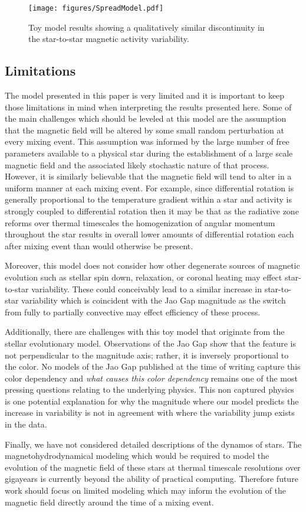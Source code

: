 \begin{figure}
  \centering
  \texttt{[image: figures/SpreadModel.pdf]}
  \caption{Toy model results showing a qualitatively similar discontinuity in the star-to-star magnetic activity variability.}
  \label{fig:model}
\end{figure}

\subsection{Limitations}
The model presented in this paper is very limited and it is important to keep
those limitations in mind when interpreting the results presented here. Some of
the main challenges which should be leveled at this model are the assumption
that the magnetic field will be altered by some small random perturbation at
every mixing event. This assumption was informed by the large number of free
parameters available to a physical star during the establishment of a large scale 
magnetic field and the associated likely stochastic nature of that process.
However, it is similarly believable that the magnetic field will tend to alter in
a uniform manner at each mixing event. For example, since differential rotation
is generally proportional to the temperature gradient within a star and activity is
strongly coupled to differential rotation then it may be that as the radiative zone reforms over thermal timescales the homogenization of angular momentum throughout the star results in overall lower amounts of differential rotation each after mixing event than would otherwise be present.

Moreover, this model does not consider how other degenerate sources of magnetic evolution such as stellar spin down, relaxation, or coronal heating may effect star-to-star variability. These could conceivably lead to a similar increase in star-to-star variability which is coincident with the Jao Gap magnitude as the switch from fully to partially convective may effect efficiency of these process.

Additionally, there are challenges with this toy model that originate from the stellar evolutionary model. Observations of the Jao Gap show that the feature is not perpendicular to the magnitude axis; rather, it is inversely proportional to the color. No models of the Jao Gap published at the time of writing capture this color dependency and \textit{what causes this color dependency} remains one of the most pressing questions relating to the underlying physics. This non captured physics is one potential explanation for why the magnitude where our model predicts the increase in variability is not in agreement with where the variability jump exists in the data.

Finally, we have not considered detailed descriptions of the dynamos of stars. The magnetohydrodynamical modeling which would be required to model the evolution of the magnetic field of these stars at thermal timescale resolutions over gigayears is currently beyond the ability of practical computing. Therefore future work should focus on limited modeling which may inform the evolution of the magnetic field directly around the time of a mixing event.
